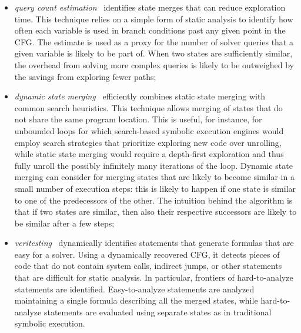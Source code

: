 \begin{itemize}

  \item {\em query count estimation}~\cite{KKB-PLDI12} identifies state merges that can reduce exploration time. This technique relies on a simple form of static analysis to identify how often each variable is used in branch conditions past any given point in the CFG. The estimate is used as a proxy for the number of solver queries that a given variable is likely to be part of. When two states are sufficiently similar, the overhead from solving more complex queries is likely to be outweighed by the savings from exploring fewer paths;

  \item {\em dynamic state merging}~\cite{KKB-PLDI12} efficiently combines static state merging with common search heuristics. This technique allows merging of states that do not share the same program location. This is useful, for instance, for unbounded loops for which search-based symbolic execution engines would employ search strategies that prioritize exploring new code over unrolling, while static state merging would require a depth-first exploration and thus fully unroll the possibly infinitely many iterations of the loop. Dynamic state merging can consider for merging states that are likely to become similar in a small number of execution steps: this is likely to happen if one state is similar to one of the predecessors of the other. The intuition behind the algorithm is that if two states are similar, then also their respective successors are likely to be similar after a few steps;

  \item {\em veritesting}~\cite{VERITESTING-ICSE14} dynamically identifies statements that generate formulas that are easy for a solver. Using a dynamically recovered CFG, it detects pieces of code that do not contain system calls, indirect jumps, or other statements that are difficult for static analysis. In particular, frontiers of hard-to-analyze statements are identified. Easy-to-analyze statements are analyzed maintaining a single formula describing all the merged states, while hard-to-analyze statements are evaluated using separate states as in traditional symbolic execution.

\end{itemize}

